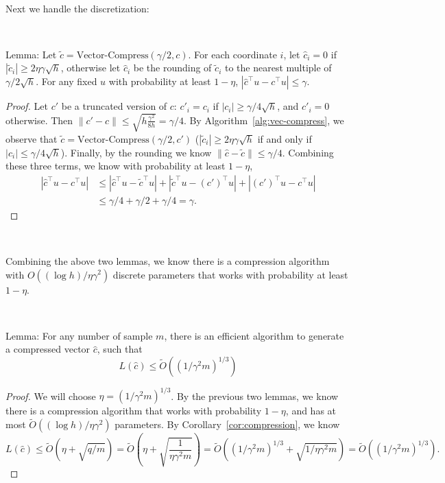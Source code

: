 \ 

Next we handle the discretization:

\

Lemma: Let $\tilde{c} = \mbox{Vector-Compress}(\gamma/2, c)$. For each coordinate $i$, let $\hat{c}_i = 0$ if $|\tilde{c}_i| \ge 2\eta\gamma\sqrt{h}$, otherwise let $\hat{c}_i$ be the rounding of $\tilde{c}_i$ to the nearest multiple of $\gamma/2\sqrt{h}$. For any fixed $u$  with probability at least $1-\eta$, $|\hat{c}^\top u - c^\top u| \le \gamma$.


\begin{proof}
Let $c'$ be a truncated version of $c$: $c'_i = c_i$ if $|c_i| \ge \gamma/4\sqrt{h}$, and $c'_i = 0$ otherwise. Then $\|c'-c\| \le \sqrt{h\frac{ \gamma^2}{8h}}=\gamma/4$. By Algorithm~\ref{alg:vec-compress}, we observe that $\tilde{c} = \mbox{Vector-Compress}(\gamma/2, c')$ ($|\tilde{c}_i| \ge 2\eta\gamma\sqrt{h}$ if and only if $|c_i| \le \gamma/4\sqrt{h}$). Finally, by the rounding we know $\|\hat{c}-\tilde{c}\|\le \gamma/4$. Combining these three terms, we know with probability at least $1-\eta$,
\begin{align*}
|\hat{c}^\top u - c^\top u| &\le  |\hat{c}^\top u - \tilde{c}^\top u|+|\tilde{c}^\top u - (c')^\top u|+|(c')^\top u - c^\top u| \\
& \le \gamma/4+\gamma/2+\gamma/4 = \gamma.
\end{align*}
\end{proof}

\ 

Combining the above two lemmas, we know there is a compression algorithm with $O((\log h)/\eta\gamma^2)$ discrete parameters that works with probability at least $1-\eta$. 

\ 

Lemma: For any number of sample $m$, there is an efficient algorithm to generate a compressed vector $\hat{c}$, such that 
$$
L(\hat{c}) \le \tilde{O}((1/\gamma^2 m)^{1/3})
$$


\begin{proof}
We will choose $\eta = (1/\gamma^2 m)^{1/3}$. By the previous two lemmas, we know there is a compression algorithm that works with probability $1-\eta$, and has at most $\tilde{O}((\log h)/\eta\gamma^2)$ parameters. By Corollary~\ref{cor:compression}, we know
$$
L(\hat{c}) \le \tilde{O}(\eta + \sqrt{q/m}) = \tilde{O}\left(\eta + \sqrt{\frac{1}{\eta\gamma^2m}}\right) = \tilde{O}((1/\gamma^2 m)^{1/3} + \sqrt{1/\eta\gamma^2m}) = \tilde{O}((1/\gamma^2 m)^{1/3}).
$$
\end{proof}



